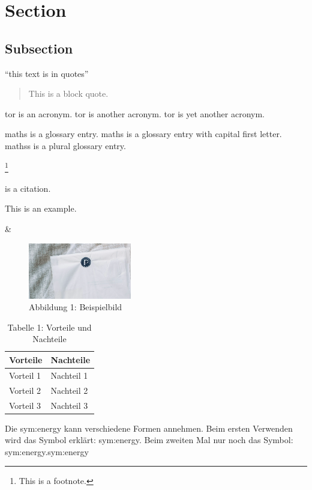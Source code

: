 
\section{Section} \label{sec:Section}

\lipsum[1]


\subsection{Subsection} \label{subsec:Subsection}



\enquote{this text is in quotes}

\begin{quote}
This is a block quote.
\end{quote}

\acrfull{tor} is an acronym.
\acrshort{tor} is another acronym.
\acrlong{tor} is yet another acronym.


\gls{maths} is a glossary entry.
\Gls{maths} is a glossary entry with capital first letter.
\glspl{maths} is a plural glossary entry.

\footnote{This is a footnote.}

\cite{nguyen_machine_2018} is a citation.

\zB This is an example.


\& 

\begin{figure}[h]
    \centering
    \includegraphics[width=0.4\textwidth]{images/image1.png}
    \caption{Abbildung 1: Beispielbild}
    \label{fig:bild}
\end{figure}

\begin{table}[h]
    \centering
    \begin{tabular}{|p{5cm}|p{5cm}|}
        \hline
        \textbf{Vorteile} & \textbf{Nachteile} \\
        \hline
        Vorteil 1 & Nachteil 1 \\
        Vorteil 2 & Nachteil 2 \\
        Vorteil 3 & Nachteil 3 \\
        \hline
    \end{tabular}
    \caption{Tabelle 1: Vorteile und Nachteile}
    \label{tab:Tabelle1}
\end{table}

Die \gls{sym:energy} kann verschiedene Formen annehmen.
Beim ersten Verwenden wird das Symbol erklärt: \gls{sym:energy}.
Beim zweiten Mal nur noch das Symbol: \gls{sym:energy}.\gls{sym:energy}
